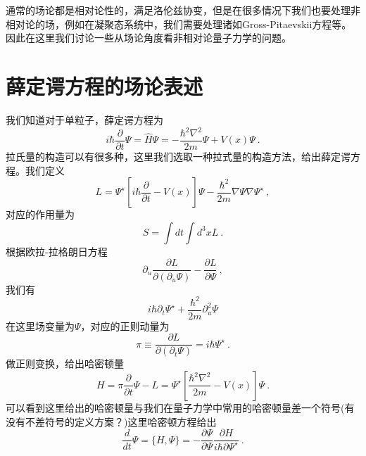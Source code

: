 
\begin{issues}
\issueDraft
\end{issues}

通常的场论都是相对论性的，满足洛伦兹协变，但是在很多情况下我们也要处理非相对论的场，例如在凝聚态系统中，我们需要处理诸如Gross-Pitaevskii方程等。因此在这里我们讨论一些从场论角度看非相对论量子力学的问题。
\section{薛定谔方程的场论表述}
我们知道对于单粒子，薛定谔方程为
\begin{equation}
i\hbar \frac{\partial}{\partial t} \Psi = \hat{H} \Psi = -\frac{\hbar^2 \nabla^2}{2m} \Psi + V(x)\Psi ~.
\end{equation}
拉氏量的构造可以有很多种，这里我们选取一种拉式量的构造方法，给出薛定谔方程。我们定义
$$
L =  \Psi^\star [i\hbar \frac{\partial}{\partial t}  - V(x)]\Psi - \frac{\hbar^2}{2m}\nabla \Psi \nabla \Psi^\star~,
$$
对应的作用量为
$$
S = \int dt \int d^3 x L~.
$$
根据欧拉-拉格朗日方程
$$
\partial_u \frac{\partial L}{\partial (\partial_u \Psi)} - \frac{\partial L}{\partial \Psi} ~,
$$
我们有
$$
i\hbar \partial_t \Psi^\star + \frac{\hbar^2}{2m}\partial_u^2 \Psi 
$$
在这里场变量为$\Psi$，对应的正则动量为
$$
\pi \equiv \frac{\partial L}{\partial (\partial_t \Psi)} = i\hbar \Psi^\star~.
$$
做正则变换，给出哈密顿量
$$
H = \pi \frac{\partial}{\partial t}\Psi - L = \Psi^\star [\frac{\hbar^2 \nabla^2}{2m}- V(x)]\Psi~.
$$
可以看到这里给出的哈密顿量与我们在量子力学中常用的哈密顿量差一个符号(有没有不差符号的定义方案？)这里哈密顿方程给出
$$
\frac{d}{d t}\Psi = \{H,\Psi\} = -\frac{\partial \Psi}{\partial \Psi}\frac{\partial H}{i\hbar \partial \Psi^\star}~.
$$